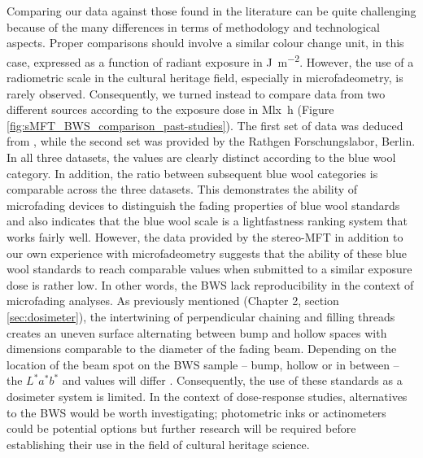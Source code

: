 Comparing our data against those found in the literature can be quite challenging because of the many differences in terms of methodology and technological aspects. Proper comparisons should involve a similar colour change unit, \dEOO in this case, expressed as a function of radiant exposure in \unit{\joule\per\square\metre}. However, the use of a radiometric scale in the cultural heritage field, especially in microfadeometry, is rarely observed. Consequently, we turned instead to compare data from two different sources according to the exposure dose in \unit{\mega\lux\hour} (Figure \ref{fig:sMFT_BWS_comparison_past-studies}). The first set of data was deduced from \cite[Figures 2, 5, 6, and 7]{ford_reality_2017}, while the second set was provided by the Rathgen Forschungslabor, Berlin. In all three datasets, the \dEOO values are clearly distinct according to the blue wool category. In addition, the ratio between subsequent blue wool categories is comparable across the three datasets. This demonstrates the ability of microfading devices to distinguish the fading properties of blue wool standards and also indicates that the blue wool scale is a lightfastness ranking system that works fairly well. However, the data provided by the stereo-MFT in addition to our own experience with microfadeometry suggests that the ability of these blue wool standards to reach comparable \dEOO values when submitted to a similar exposure dose is rather low. In other words, the \gls{BWS} lack reproducibility in the context of microfading analyses. As previously mentioned (Chapter 2, section \ref{sec:dosimeter}), the intertwining of perpendicular chaining and filling threads creates an uneven surface alternating between bump and hollow spaces with dimensions comparable to the diameter of the fading beam. Depending on the location of the beam spot on the \gls{BWS} sample – bump, hollow or in between – the $L^*a^*b^*$ and \dE values will differ \citep{prestel_alternative_2016}. Consequently, the use of these standards as a dosimeter system is limited. In the context of dose-response studies, alternatives to the \gls{BWS} would be worth investigating; photometric inks or actinometers could be potential options but further research will be required before establishing their use in the field of cultural heritage science.\\

